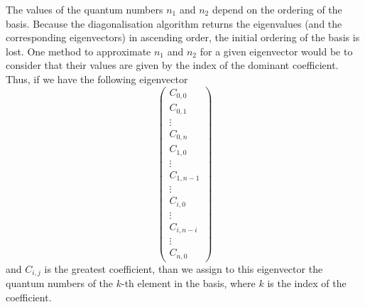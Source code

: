 \documentclass[../thesis.tex]{subfiles}
\begin{document}
The values of the quantum numbers \(n_1\) and \(n_2\) depend on the ordering of the basis.
Because the diagonalisation algorithm returns the eigenvalues
(and the corresponding eigenvectors) in ascending order,
the initial ordering of the basis is lost.
One method to approximate \(n_1\) and \(n_2\) for a given eigenvector would be
to consider that their values are given by the index of the dominant coefficient.
Thus, if we have the following eigenvector
\[
\begin{pmatrix}
    C_{0,0} \\ C_{0,1} \\ \vdots \\ C_{0,n} \\ C_{1,0} \\ \vdots \\ C_{1,n-1} \\
    \vdots \\ C_{i,0} \\ \vdots \\ C_{i,n-i} \\ \vdots \\ C_{n,0}
  \end{pmatrix}
\]
and \(C_{i,j}\) is the greatest coefficient, than we assign to this eigenvector
the quantum numbers of the \(k\)-th element in the basis, where \(k\) is the
index of the coefficient.
\end{document}
